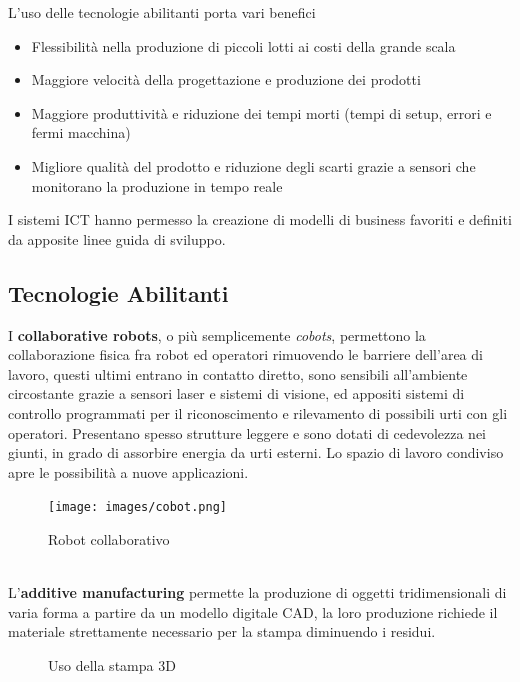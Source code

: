 \documentclass[10pt, letterpaper]{report}
\begin{document}
L'uso delle tecnologie abilitanti porta vari benefici\begin{itemize}
    \item Flessibilità nella produzione di piccoli lotti ai costi della grande scala 
    \item Maggiore velocità della progettazione e produzione dei prodotti 
    \item Maggiore produttività e riduzione dei tempi morti (tempi di setup, errori e fermi macchina)
    \item Migliore qualità del prodotto e riduzione degli scarti grazie a sensori che monitorano la produzione in tempo reale  
\end{itemize}
I sistemi ICT hanno permesso la creazione di modelli di business favoriti e definiti da 
apposite linee guida di sviluppo.\subsection{Tecnologie Abilitanti}
I \textbf{collaborative robots}, o più semplicemente \textit{cobots}, permettono la collaborazione 
fisica fra robot ed operatori rimuovendo le barriere dell'area di lavoro, questi ultimi entrano in contatto 
diretto, sono sensibili all'ambiente circostante grazie a sensori laser e sistemi di visione, ed appositi sistemi di controllo programmati 
per il riconoscimento e rilevamento di possibili urti con gli operatori. Presentano spesso strutture leggere e sono 
dotati di cedevolezza nei giunti, in grado di assorbire energia da urti esterni. Lo spazio di lavoro condiviso apre 
le possibilità a nuove applicazioni. \\\begin{figure}[h!]
    \centering
    \texttt{[image: images/cobot.png]}
    \caption{Robot collaborativo}
\end{figure}\\
L'\textbf{additive manufacturing} permette la produzione di oggetti tridimensionali di varia forma a partire da 
un modello digitale CAD, la loro produzione richiede il materiale strettamente necessario per la stampa diminuendo i 
residui.\\\begin{figure}[h!]
    \centering
    \caption{Uso della stampa 3D}
\end{figure}\\
\end{document}
